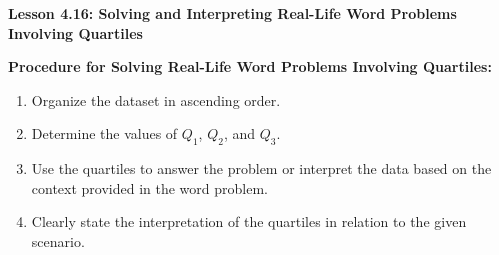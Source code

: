 \begin{center}
\textbf{Lesson 4.16: Solving and Interpreting Real-Life Word Problems Involving Quartiles}
\end{center}

\vspace*{-1.5ex}

\noindent\textbf{Procedure for Solving Real-Life Word Problems Involving Quartiles:}  
\begin{enumerate}
    \item Organize the dataset in ascending order.  
    \item Determine the values of \(Q_1\), \(Q_2\), and \(Q_3\).  
    \item Use the quartiles to answer the problem or interpret the data based on the context provided in the word problem.  
    \item Clearly state the interpretation of the quartiles in relation to the given scenario.
\end{enumerate}
